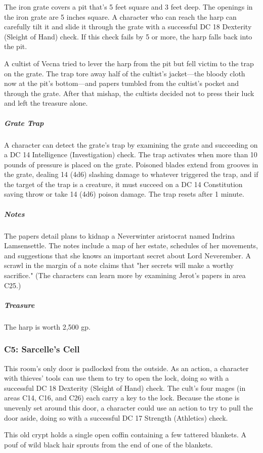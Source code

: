 \documentclass[10pt,a4paper,twoside,bg=print,twocolumn,openany,nodeprecatedcode]{dndbook}
\begin{document}
The iron grate covers a pit that's 5 feet square and 3 feet deep. The openings in the iron grate are 5 inches square. A character who can reach the harp can carefully tilt it and slide it through the grate with a successful DC 18 Dexterity (Sleight of Hand) check. If this check fails by 5 or more, the harp falls back into the pit.

A cultist of Vecna tried to lever the harp from the pit but fell victim to the trap on the grate. The trap tore away half of the cultist's jacket—the bloody cloth now at the pit's bottom—and papers tumbled from the cultist's pocket and through the grate. After that mishap, the cultists decided not to press their luck and left the treasure alone.

\subparagraph{Grate Trap}
A character can detect the grate's trap by examining the grate and succeeding on a DC 14 Intelligence (Investigation) check. The trap activates when more than 10 pounds of pressure is placed on the grate. Poisoned blades extend from grooves in the grate, dealing 14 (4d6) slashing damage to whatever triggered the trap, and if the target of the trap is a creature, it must succeed on a DC 14 Constitution saving throw or take 14 (4d6) poison damage. The trap resets after 1 minute.

\subparagraph{Notes}
The papers detail plans to kidnap a Neverwinter aristocrat named Indrina Lamsensettle. The notes include a map of her estate, schedules of her movements, and suggestions that she knows an important secret about Lord Neverember. A scrawl in the margin of a note claims that "her secrets will make a worthy sacrifice." (The characters can learn more by examining Jerot's papers in area C25.)

\subparagraph{Treasure}
The harp is worth 2,500 gp.

\subsubsection{C5: Sarcelle's Cell}
This room's only door is padlocked from the outside. As an action, a character with thieves' tools can use them to try to open the lock, doing so with a successful DC 18 Dexterity (Sleight of Hand) check. The cult's four mages (in areas C14, C16, and C26) each carry a key to the lock. Because the stone is unevenly set around this door, a character could use an action to try to pull the door aside, doing so with a successful DC 17 Strength (Athletics) check.

\begin{DndReadAloud}{}
This old crypt holds a single open coffin containing a few tattered blankets. A pouf of wild black hair sprouts from the end of one of the blankets.

\end{DndReadAloud}
\end{document}
